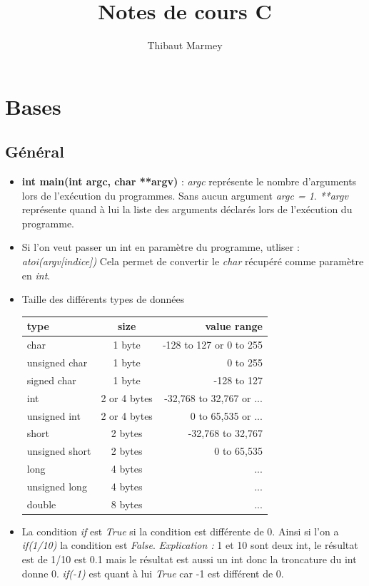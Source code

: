 \documentclass[12pt,a4paper]{article}
\author{Thibaut Marmey}
\title{Notes de cours C}
\begin{document}
	\maketitle
	
\begin{normalsize}
\tableofcontents
\end{normalsize}

\section{Bases}
\subsection{Général}
\begin{itemize}
\item \textbf{int main(int argc, char **argv)} : \textit{argc} représente le nombre d'arguments lors de l'exécution du programmes. Sans aucun argument \textit{argc = 1}.
\textit{**argv} représente quand à lui la liste des arguments déclarés lors de l'exécution du programme.
\item Si l'on veut passer un int en paramètre du programme, utliser : \textit{atoi(argv[indice])}
\newline Cela permet de convertir le \textit{char} récupéré comme paramètre en \textit{int}.
\item Taille des différents types de données
\newline
\begin{tabular}{|l|c|r|}
  \hline
  type & size & value range \\
  \hline \hline
  char & 1 byte & -128 to 127 or 0 to 255 \\ \hline
  unsigned char & 1 byte & 0 to 255 \\ \hline
  signed char & 1 byte & -128 to 127 \\ \hline
  int & 2 or 4 bytes & -32,768 to 32,767 or ... \\ \hline
  unsigned int & 2 or 4 bytes & 0 to 65,535 or ... \\ \hline
  short & 2 bytes & -32,768 to 32,767 \\ \hline
  unsigned short & 2 bytes & 0 to 65,535 \\ \hline
  long & 4 bytes & ... \\ \hline
  unsigned long & 4 bytes & ... \\ \hline
  double & 8 bytes & ... \\ \hline
\end{tabular}
\item La condition \textit{if} est \textit{True} si la condition est différente de 0. 
\newline Ainsi si l'on a \textit{if(1/10)} la condition est \textit{False}. \textit{Explication : }1 et 10 sont deux int, le résultat est de 1/10 est 0.1 mais le résultat est aussi un int donc la troncature du int donne 0.
\newline \textit{if(-1)} est quant à lui \textit{True} car -1 est différent de 0.
\end{itemize}
\end{document}
